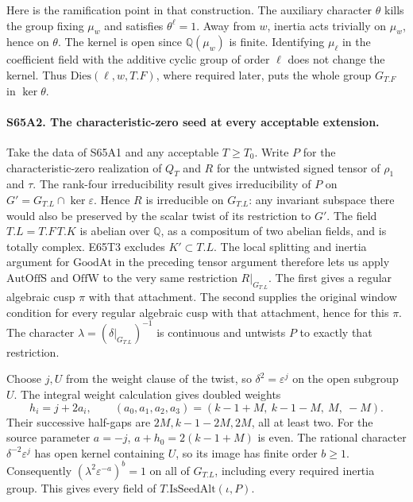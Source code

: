 Here is the ramification point in that construction. The auxiliary
character $\theta$ kills the group fixing $\mu_w$ and satisfies
$\theta^\ell=1$. Away from $w$, inertia acts trivially on
$\mu_w$, hence on $\theta$. The kernel is open since
$\mathbb Q(\mu_w)$ is finite. Identifying $\mu_\ell$ in the
coefficient field with the additive cyclic group of order $\ell$
does not change the kernel. Thus $\mathrm{Dies}(\ell,w,T.F)$,
where required later, puts the whole group $G_{T.F}$ in
$\ker\theta$.

\paragraph{S65A2. The characteristic-zero seed at every acceptable extension.}
Take the data of S65A1 and any acceptable $T\ge T_0$. Write
$P$ for the characteristic-zero realization of $Q_T$ and $R$ for
the untwisted signed tensor of $\rho_1$ and $\tau$. The rank-four
irreducibility result gives irreducibility of $P$ on
$G'=G_{T.L}\cap\ker\varepsilon$. Hence $R$ is irreducible on
$G_{T.L}$: any invariant subspace there would also be preserved
by the scalar twist of its restriction to $G'$. The field
$T.L=T.F\,T.K$ is abelian over $\mathbb Q$, as a compositum of two
abelian fields, and is totally complex. E65T3 excludes $K'\subset T.L$.
The local splitting and inertia argument for $\mathrm{GoodAt}$
in the preceding tensor argument therefore lets us apply
$\mathrm{AutOffS}$ and $\mathrm{OffW}$ to the very same restriction
$R|_{G_{T.L}}$. The first gives a regular algebraic cusp $\pi$ with
that attachment. The second supplies the original window condition
for every regular algebraic cusp with that attachment, hence for
this $\pi$. The character $\lambda=(\delta|_{G_{T.L}})^{-1}$ is
continuous and untwists $P$ to exactly that restriction.

Choose $j,U$ from the weight clause of the twist, so
$\delta^2=\varepsilon^j$ on the open subgroup $U$.
The integral weight calculation gives doubled weights
\[
 h_i=j+2a_i,\qquad
 (a_0,a_1,a_2,a_3)=(k-1+M,\ k-1-M,\ M,\ -M).
\]
Their successive half-gaps are $2M,k-1-2M,2M$, all at least two.
For the source parameter $a=-j$, $a+h_0=2(k-1+M)$ is even.
The rational character $\delta^{-2}\varepsilon^j$ has open
kernel containing $U$, so its image has finite order $b\ge1$.
Consequently $(\lambda^2\varepsilon^{-a})^b=1$ on all of
$G_{T.L}$, including every required inertia group. This gives
every field of $T.\mathrm{IsSeedAlt}(\iota,P)$.

